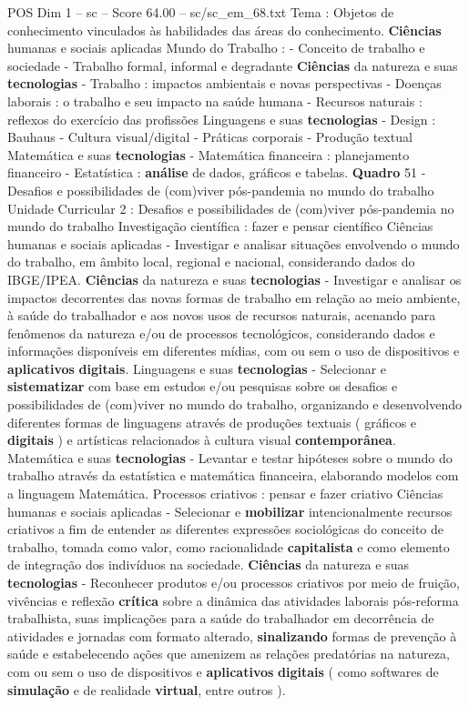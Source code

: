\begin{textsample}{POS Dim 1 – sc – Score 64.00 – sc/sc\_em\_68.txt}
Tema : Objetos de conhecimento vinculados às habilidades das áreas do conhecimento. \textbf{Ciências} humanas e sociais aplicadas Mundo do Trabalho : - Conceito de trabalho e sociedade - Trabalho formal, informal e degradante \textbf{Ciências} da natureza e suas \textbf{tecnologias} - Trabalho : impactos ambientais e novas perspectivas - Doenças laborais : o trabalho e seu impacto na saúde humana - Recursos naturais : reflexos do exercício das profissões Linguagens e suas \textbf{tecnologias} - Design : Bauhaus - Cultura visual/digital - Práticas corporais - Produção textual Matemática e suas \textbf{tecnologias} - Matemática financeira : planejamento financeiro - Estatística : \textbf{análise} de dados, gráficos e tabelas. \textbf{Quadro} 51 - Desafios e possibilidades de (com)viver pós-pandemia no mundo do trabalho Unidade Curricular 2 : Desafios e possibilidades de (com)viver pós-pandemia no mundo do trabalho Investigação científica : fazer e pensar científico Ciências humanas e sociais aplicadas - Investigar e analisar situações envolvendo o mundo do trabalho, em âmbito local, regional e nacional, considerando dados do IBGE/IPEA. \textbf{Ciências} da natureza e suas \textbf{tecnologias} - Investigar e analisar os impactos decorrentes das novas formas de trabalho em relação ao meio ambiente, à saúde do trabalhador e aos novos usos de recursos naturais, acenando para fenômenos da natureza e/ou de processos tecnológicos, considerando dados e informações disponíveis em diferentes mídias, com ou sem o uso de dispositivos e \textbf{aplicativos} \textbf{digitais}.
Linguagens e suas \textbf{tecnologias} - Selecionar e \textbf{sistematizar} com base em estudos e/ou pesquisas sobre os desafios e possibilidades de (com)viver no mundo do trabalho, organizando e desenvolvendo diferentes formas de linguagens através de produções textuais ( gráficos e \textbf{digitais} ) e artísticas relacionados à cultura visual \textbf{contemporânea}.
Matemática e suas \textbf{tecnologias} - Levantar e testar hipóteses sobre o mundo do trabalho através da estatística e matemática financeira, elaborando modelos com a linguagem Matemática.
Processos criativos : pensar e fazer criativo Ciências humanas e sociais aplicadas - Selecionar e \textbf{mobilizar} intencionalmente recursos criativos a fim de entender as diferentes expressões sociológicas do conceito de trabalho, tomada como valor, como racionalidade \textbf{capitalista} e como elemento de integração dos indivíduos na sociedade. \textbf{Ciências} da natureza e suas \textbf{tecnologias} - Reconhecer produtos e/ou processos criativos por meio de fruição, vivências e reflexão \textbf{crítica} sobre a dinâmica das atividades laborais pós-reforma trabalhista, suas implicações para a saúde do trabalhador em decorrência de atividades e jornadas com formato alterado, \textbf{sinalizando} formas de prevenção à saúde e estabelecendo ações que amenizem as relações predatórias na natureza, com ou sem o uso de dispositivos e \textbf{aplicativos} \textbf{digitais} ( como softwares de \textbf{simulação} e de realidade \textbf{virtual}, entre outros ).

\end{textsample}
